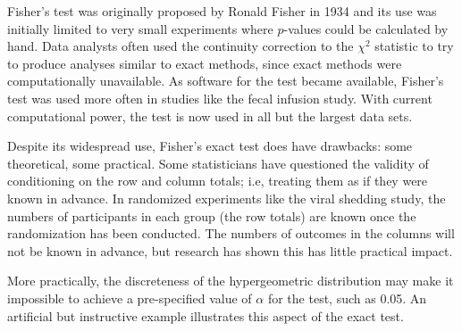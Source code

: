 Fisher's test was originally proposed by Ronald Fisher in 1934 and its use was initially limited to very small experiments where $p$-values could be calculated by hand.  Data analysts often used the continuity correction to the $\chi^2$ statistic to try to produce analyses similar to exact methods, since exact methods were computationally unavailable. As software for the test became available, Fisher's test was used more often in studies like the fecal infusion study.  With current computational power, the test is now used in all but the largest data sets.

Despite its widespread use, Fisher's exact test does have drawbacks: some theoretical, some practical.  Some statisticians have questioned the validity of conditioning on the row and column totals; i.e, treating them as if they were known in advance.  In randomized experiments like the viral shedding study, the numbers of participants in each group (the row totals) are known once the randomization has been conducted. The numbers of outcomes in the columns will not be known in advance, but research has shown this has little practical impact.


More practically, the discreteness of the hypergeometric distribution may make it impossible to achieve a pre-specified value of $\alpha$ for the test, such as 0.05.  An artificial but instructive example illustrates this aspect of the exact test.

